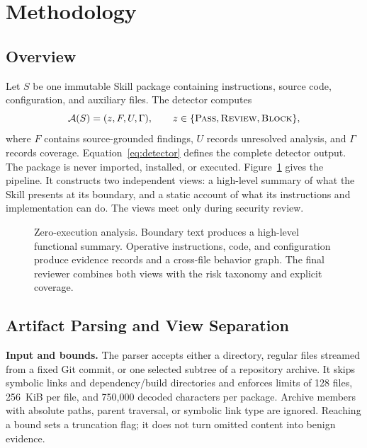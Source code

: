 \section{Methodology}
\label{sec:methodology}

\subsection{Overview}

Let $S$ be one immutable Skill package containing instructions, source code,
configuration, and auxiliary files.  The detector computes
\begin{equation}
\mathcal{A}(S)=(z,F,U,\Gamma), \qquad
z\in\{\textsc{Pass},\textsc{Review},\textsc{Block}\},
\label{eq:detector}
\end{equation}
where $F$ contains source-grounded findings, $U$ records unresolved analysis,
and $\Gamma$ records coverage. Equation~\ref{eq:detector} defines the complete
detector output. The package is never imported, installed, or
executed.  Figure~\ref{fig:method} gives the pipeline.  It constructs two
independent views: a high-level summary of what the Skill presents at its
boundary, and a static account of what its instructions and implementation can
do.  The views meet only during security review.

\begin{figure}[!t]
  \centering
  \resizebox{0.98\textwidth}{!}{}
  \caption{Zero-execution analysis. Boundary text produces a high-level
  functional summary. Operative instructions, code, and configuration produce
  evidence records and a cross-file behavior graph. The final reviewer combines
  both views with the risk taxonomy and explicit coverage.}
  \label{fig:method}
\end{figure}

\subsection{Artifact Parsing and View Separation}
\label{sec:parsing}

\textbf{Input and bounds.} The parser accepts either a directory, regular
files streamed from a fixed Git commit, or one selected subtree of a repository
archive. It skips symbolic links and dependency/build directories and enforces
limits of 128 files, 256~KiB per file, and 750,000 decoded characters per
package. Archive members with absolute paths, parent traversal, or symbolic
link type are ignored. Reaching a bound sets a truncation flag; it does not
turn omitted content into benign evidence.

